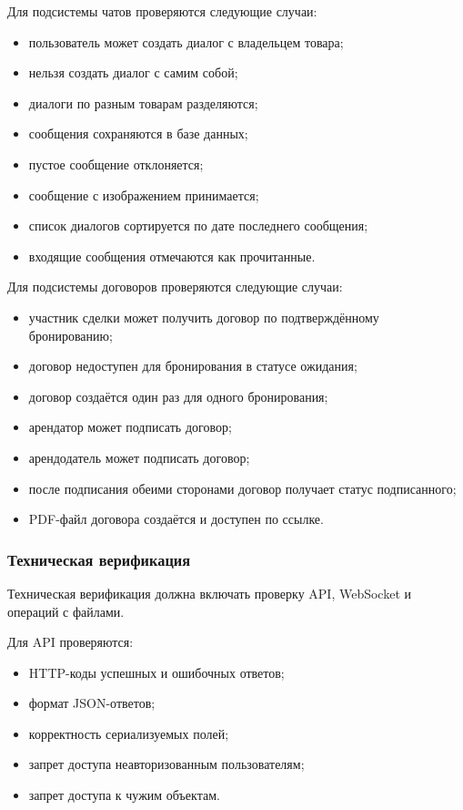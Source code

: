 Для подсистемы чатов проверяются следующие случаи:
\begin{itemize}
    \item пользователь может создать диалог с владельцем товара;
    \item нельзя создать диалог с самим собой;
    \item диалоги по разным товарам разделяются;
    \item сообщения сохраняются в базе данных;
    \item пустое сообщение отклоняется;
    \item сообщение с изображением принимается;
    \item список диалогов сортируется по дате последнего сообщения;
    \item входящие сообщения отмечаются как прочитанные.
\end{itemize}

Для подсистемы договоров проверяются следующие случаи:
\begin{itemize}
    \item участник сделки может получить договор по подтверждённому бронированию;
    \item договор недоступен для бронирования в статусе ожидания;
    \item договор создаётся один раз для одного бронирования;
    \item арендатор может подписать договор;
    \item арендодатель может подписать договор;
    \item после подписания обеими сторонами договор получает статус подписанного;
    \item PDF-файл договора создаётся и доступен по ссылке.
\end{itemize}

\subsubsection{Техническая верификация}
Техническая верификация должна включать проверку API, WebSocket и операций с файлами.

Для API проверяются:
\begin{itemize}
    \item HTTP-коды успешных и ошибочных ответов;
    \item формат JSON-ответов;
    \item корректность сериализуемых полей;
    \item запрет доступа неавторизованным пользователям;
    \item запрет доступа к чужим объектам.
\end{itemize}

